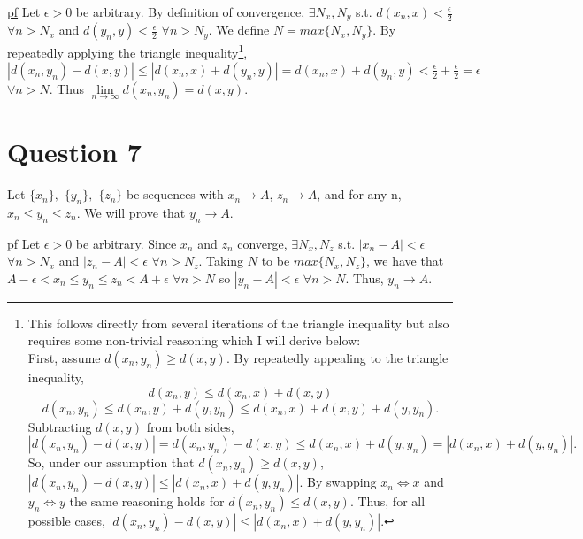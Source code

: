 \documentclass[11pt]{article} %
\begin{document}
\underline{pf} Let $\epsilon>0$ be arbitrary. By definition of convergence,  $\exists N_x,N_y$ s.t. $d(x_n,x)<\frac{\epsilon}{2}$ $\forall n>N_x$ and $d(y_n,y)<\frac{\epsilon}{2}$ $\forall n>N_y$. We define $N = max \{ N_x,N_y \}$. By repeatedly applying the triangle inequality\footnote{This follows directly from several iterations of the triangle inequality but also requires some non-trivial reasoning which I will derive below: \\ First, assume $d(x_n,y_n) \geq d(x,y).$
By repeatedly appealing to the triangle inequality, 
\begin{equation}
d(x_n,y) \leq d(x_n,x) + d(x,y)
\end{equation}
\begin{equation}
d(x_n,y_n) \leq d(x_n,y) + d(y,y_n) \leq d(x_n,x) + d(x,y) + d(y,y_n).
\end{equation}
Subtracting $d(x,y)$ from both sides,
\begin{equation}
|d(x_n,y_n) - d(x,y)| = d(x_n,y_n) - d(x,y) \leq d(x_n,x) + d(y,y_n) = |d(x_n,x) + d(y,y_n)|.
\end{equation}
So, under our assumption that $d(x_n,y_n) \geq d(x,y)$, $|d(x_n,y_n) - d(x,y)| \leq |d(x_n,x) + d(y,y_n)|$. By swapping $x_n \iff x$ and $y_n \iff y$ the same reasoning holds for $d(x_n,y_n) \leq d(x,y)$. Thus, for all possible cases, $|d(x_n,y_n) - d(x,y)| \leq |d(x_n,x) + d(y,y_n)|$.
}, $|d(x_n,y_n) - d(x,y)| \leq |d(x_n,x)+ d(y_n,y)| = d(x_n,x)+ d(y_n,y) < \frac{\epsilon}{2} +  \frac{\epsilon}{2} = \epsilon$ $ \forall n>N$. Thus $\lim\limits_{n \rightarrow \infty} d(x_n,y_n) = d(x,y).$

\section{Question 7}
Let $\{ x_n\},$ $\{ y_n\},$ $\{ z_n\}$ be sequences with $x_n \rightarrow A$, $z_n \rightarrow A$, and for any n, $x_n\leq y_n \leq z_n$. We will prove that $y_n \rightarrow A$.

\underline{pf} Let $\epsilon > 0$ be arbitrary. Since $x_n$ and $z_n$ converge, $\exists N_x,N_z$ s.t. $|x_n - A|<\epsilon$ $\forall n>N_x$ and  $|z_n - A|<\epsilon$ $\forall n>N_z$. Taking $N$ to be $max\{ N_x, N_z\}$, we have that $A-\epsilon< x_n \leq y_n \leq z_n  <A+\epsilon$ $\forall n>N$ so $|y_n - A|<\epsilon$ $\forall n>N$. Thus, $y_n \rightarrow A$. 
\end{document}
